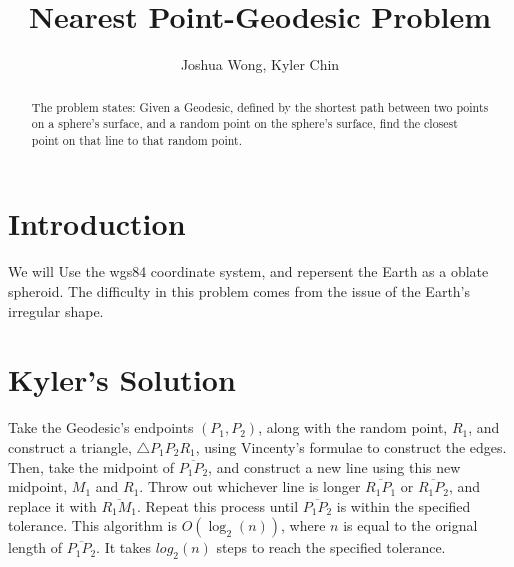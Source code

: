 \documentclass[a4paper,10pt]{article}
\title{Nearest Point-Geodesic Problem}
\author{Joshua Wong, Kyler Chin}
\begin{document}
\maketitle

\begin{abstract}
The problem states: Given a Geodesic, defined by the shortest path between two points on a sphere's surface, and a random point on the sphere's surface, find the closest point on that line to that random point.
\end{abstract}
\section{Introduction}
We will Use the wgs84 coordinate system, and repersent the Earth as a oblate spheroid. The difficulty in this problem comes from the issue of the Earth's irregular shape.
\section{Kyler's Solution}
Take the Geodesic's endpoints $(P_1, P_2)$, along with the random point, $R_1$, and construct a triangle, $\triangle{P_1P_2R_1}$, using Vincenty's formulae to construct the edges. Then, take the midpoint of $\overline{P_1P_2}$, and construct a new line using this new midpoint, $M_1$ and $R_1$. Throw out whichever line is longer $\overline{R_1P_1}$ or $\overline{R_1P_2}$, and replace it with $\overline{R_1M_1}$. Repeat this process until $\overline{P_1P_2}$ is within the specified tolerance. This algorithm is $O(\log_2(n))$, where $n$ is equal to the orignal length of $\overline{P_1P_2}$. It takes $log_2(n)$ steps to reach the specified tolerance.
\end{document}
